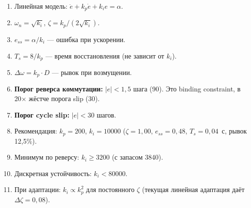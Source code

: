 \documentclass[12pt,a4paper]{article}
\begin{document}
\begin{enumerate}
  \item Линейная модель: $\ddot{e} + k_p\dot{e} + k_i e = \alpha$.
  \item $\omega_n = \sqrt{k_i}$, $\zeta = k_p/(2\sqrt{k_i})$.
  \item $e_{ss} = \alpha/k_i$ --- ошибка при ускорении.
  \item $T_s = 8/k_p$ --- время восстановления (не зависит от $k_i$).
  \item $\Delta\omega = k_p \cdot D$ --- рывок при возмущении.
  \item \textbf{Порог реверса коммутации:} $|e| < 1{,}5$ шага (90\textdegree{}).
        Это binding constraint, в 20$\times$ жёстче порога slip (30).
  \item \textbf{Порог cycle slip:} $|e| < 30$ шагов.
  \item Рекомендация: $k_p = 200$, $k_i = 10000$ ($\zeta = 1{,}00$,
        $e_{ss} = 0{,}48$, $T_s = 0{,}04$~с, рывок 12{,}5\%).
  \item Минимум по реверсу: $k_i \ge 3200$ (с запасом 3840).
  \item Дискретная устойчивость: $k_i < 80000$.
  \item При адаптации: $k_i \propto k_p^2$ для постоянного $\zeta$
        (текущая линейная адаптация даёт $\Delta\zeta = 0{,}08$).
\end{enumerate}
\end{document}
